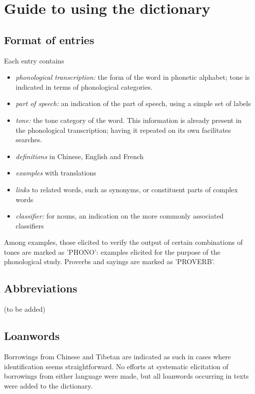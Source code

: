 \section{Guide to using the dictionary} \label{sec:howto}

	\subsection{Format of entries} \label{sec:entries}

Each entry contains
\begin{itemize}
	\item \textit{phonological transcription:} the form of the word in phonetic alphabet; tone is indicated in terms of phonological categories. 
	\item \textit{part of speech:} an indication of the part of speech, using a simple set of labels
	\item \textit{tone:} the tone category of the word. This information is already present in the phonological transcription; having it repeated on its own facilitates searches.
	\item \textit{definitions} in Chinese, English and French
	\item \textit{examples} with translations
	\item \textit{links} to related words, such as synonyms, or constituent parts of complex words 
	\item \textit{classifier:} for nouns, an indication on the more commonly associated classifiers
\end{itemize}

Among examples, those elicited to verify the output of certain combinations of tones are marked as 'PHONO': examples elicited for the purpose of the phonological study. Proverbs and sayings are marked as 'PROVERB'.

	\subsection{Abbreviations} \label{sec:abbrev}
	
	(to be added)


	\subsection{Loanwords} \label{sec:loan}

Borrowings from Chinese and Tibetan are indicated as such in cases where identification seems straightforward. No efforts at systematic elicitation of borrowings from either language were made, but all loanwords occurring in texts were added to the dictionary.

